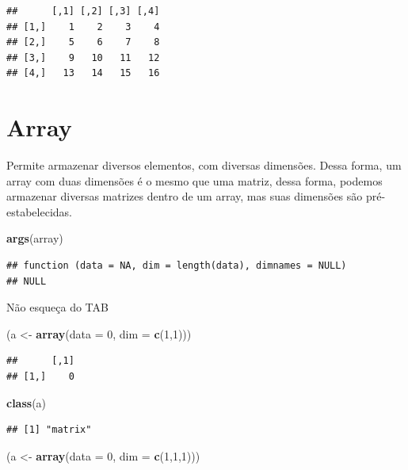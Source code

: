 \documentclass[]{book}
\newenvironment{Shaded}{\begin{snugshade}}{\end{snugshade}}
\newcommand{\KeywordTok}[1]{\textcolor[rgb]{0.13,0.29,0.53}{\textbf{#1}}}
\newcommand{\DataTypeTok}[1]{\textcolor[rgb]{0.13,0.29,0.53}{#1}}
\newcommand{\DecValTok}[1]{\textcolor[rgb]{0.00,0.00,0.81}{#1}}
\newcommand{\StringTok}[1]{\textcolor[rgb]{0.31,0.60,0.02}{#1}}
\newcommand{\NormalTok}[1]{#1}
\begin{document}
\begin{verbatim}
##      [,1] [,2] [,3] [,4]
## [1,]    1    2    3    4
## [2,]    5    6    7    8
## [3,]    9   10   11   12
## [4,]   13   14   15   16
\end{verbatim}

\section{Array}\label{array}

Permite armazenar diversos elementos, com diversas dimensões. Dessa
forma, um array com duas dimensões é o mesmo que uma matriz, dessa
forma, podemos armazenar diversas matrizes dentro de um array, mas suas
dimensões são pré-estabelecidas.

\begin{Shaded}
\begin{Highlighting}[]
\KeywordTok{args}\NormalTok{(array)}
\end{Highlighting}
\end{Shaded}

\begin{verbatim}
## function (data = NA, dim = length(data), dimnames = NULL) 
## NULL
\end{verbatim}

Não esqueça do TAB

\begin{Shaded}
\begin{Highlighting}[]
\NormalTok{(a <-}\StringTok{ }\KeywordTok{array}\NormalTok{(}\DataTypeTok{data =} \DecValTok{0}\NormalTok{, }\DataTypeTok{dim =} \KeywordTok{c}\NormalTok{(}\DecValTok{1}\NormalTok{,}\DecValTok{1}\NormalTok{)))}
\end{Highlighting}
\end{Shaded}

\begin{verbatim}
##      [,1]
## [1,]    0
\end{verbatim}

\begin{Shaded}
\begin{Highlighting}[]
\KeywordTok{class}\NormalTok{(a)}
\end{Highlighting}
\end{Shaded}

\begin{verbatim}
## [1] "matrix"
\end{verbatim}

\begin{Shaded}
\begin{Highlighting}[]
\NormalTok{(a <-}\StringTok{ }\KeywordTok{array}\NormalTok{(}\DataTypeTok{data =} \DecValTok{0}\NormalTok{, }\DataTypeTok{dim =} \KeywordTok{c}\NormalTok{(}\DecValTok{1}\NormalTok{,}\DecValTok{1}\NormalTok{,}\DecValTok{1}\NormalTok{)))}
\end{Highlighting}
\end{Shaded}
\end{document}
